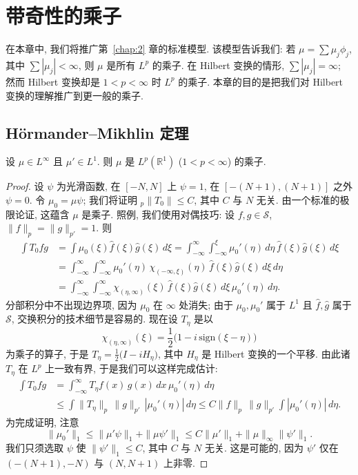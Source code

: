 \chapter{带奇性的乘子}
\label{chap:4}

在本章中, 我们将推广第~\ref{chap:2} 章的标准模型. 该模型告诉我们: 若 $\mu=\sum\mu_j\phi_j$, 其中 $\sum|\mu_j|<\infty$, 则 $\mu$ 是所有 $L^p$ 的乘子. 在 Hilbert 变换的情形, $\sum|\mu_j|=\infty$; 然而 Hilbert 变换却是 $1<p<\infty$ 时 $L^p$ 的乘子. 本章的目的是把我们对 Hilbert 变换的理解推广到更一般的乘子.

\section{H\"ormander--Mikhlin 定理}
\label{sec:4.1}

\begin{proposition}\label{prop:4.1}
设 $\mu\in L^\infty$ 且 $\mu'\in L^1$. 则 $\mu$ 是 $L^p(\mathbb{R}^1)$ ($1<p<\infty$) 的乘子.
\end{proposition}

\begin{proof}
设 $\psi$ 为光滑函数, 在 $[-N,N]$ 上 $\psi=1$, 在 $[-(N+1),(N+1)]$ 之外 $\psi=0$. 令 $\mu_0=\mu\psi$; 我们将证明 ${}_p\|T_0\|\leq C$, 其中 $C$ 与 $N$ 无关. 由一个标准的极限论证, 这蕴含 $\mu$ 是乘子. 照例, 我们使用对偶技巧: 设 $f,g\in\mathcal{S}$, $\|f\|_p=\|g\|_{p'}=1$. 则
\begin{align*}
\int T_{0}fg&=\int\mu_{0}(\xi)\hat{f}(\xi)\hat{g}(\xi)\,d\xi
=\int_{-\infty}^{\infty}\int_{-\infty}^{\xi}\mu_{0}'(\eta)\,d\eta\,\hat{f}(\xi)\hat{g}(\xi)\,d\xi \\
&=\int_{-\infty}^{\infty}\int_{-\infty}^{\infty}\mu_{0}'(\eta)\,\chi_{(-\infty,\xi)}(\eta)\,\hat{f}(\xi)\hat{g}(\xi)\,d\xi\,d\eta \\
&=\int_{-\infty}^{\infty}\int_{-\infty}^{\infty}\chi_{(\eta,\infty)}(\xi)\,\hat{f}(\xi)\hat{g}(\xi)\,d\xi\,\mu_{0}'(\eta)\,d\eta.
\end{align*}
分部积分中不出现边界项, 因为 $\mu_0$ 在 $\infty$ 处消失; 由于 $\mu_0,\mu_0'$ 属于 $L^1$ 且 $\hat{f},\hat{g}$ 属于 $\mathcal{S}$, 交换积分的技术细节是容易的. 现在设 $T_\eta$ 是以
\[
\chi_{(\eta,\infty)}(\xi)=\frac{1}{2}\bigl(1-i\,\mathrm{sign}(\xi-\eta)\bigr)
\]
为乘子的算子, 于是 $T_{\eta}=\frac{1}{2}\bigl(I-iH_{\eta}\bigr)$, 其中 $H_{\eta}$ 是 Hilbert 变换的一个平移. 由此诸 $T_{\eta}$ 在 $L^{p}$ 上一致有界, 于是我们可以这样完成估计:
\begin{align*}
\int T_{0}fg&=\int_{-\infty}^{\infty}T_{\eta}f(x)\,g(x)\,dx\,\mu_{0}'(\eta)\,d\eta \\
&\leq\int\|T_{\eta}\|_{p}\,\|g\|_{p'}\,|\mu_{0}'(\eta)|\,d\eta
\leq C\|f\|_{p}\,\|g\|_{p'}\int|\mu_{0}'(\eta)|\,d\eta.
\end{align*}
为完成证明, 注意
\[
\|\mu_{0}'\|_{1}\leq\|\mu'\psi\|_{1}+\|\mu\psi'\|_{1}\leq C\|\mu'\|_{1}+\|\mu\|_{\infty}\|\psi'\|_{1}.
\]
我们只须选取 $\psi$ 使 $\|\psi'\|_{1}\leq C$, 其中 $C$ 与 $N$ 无关. 这是可能的, 因为 $\psi'$ 仅在 $(-(N+1),-N)$ 与 $(N,N+1)$ 上非零.
\end{proof}

